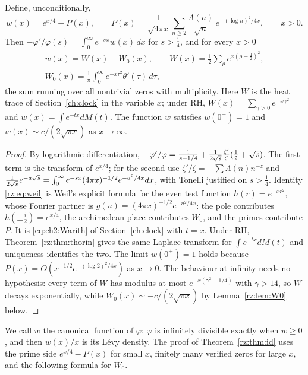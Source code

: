\begin{theorem}\label{rz:thm:w}
Define, unconditionally,
\[
w(x)=e^{x/4}-P(x),\qquad P(x)=\frac{1}{\sqrt{4\pi x}}\sum_{n\ge2}\frac{\Lambda(n)}{\sqrt n}\,e^{-(\log n)^2/4x},\qquad x>0.
\]
Then $-\varphi'/\varphi(s)=\int_0^\infty e^{-sx}w(x)\,dx$ for $s>\frac14$, and for every $x>0$
\begin{equation}\label{rz:eq:weil}
\begin{gathered}
w(x)=W(x)-W_0(x),\qquad W(x)=\tfrac12\sum_\rho e^{x(\rho-\frac12)^2},\\
W_0(x)=\frac1\pi\int_0^\infty e^{-x\tau^2}\theta'(\tau)\,d\tau,
\end{gathered}
\end{equation}
the sum running over all nontrivial zeros with multiplicity. Here $W$ is the heat trace of Section~\ref{ch:clock} in the variable $x$; under RH, $W(x)=\sum_{\gamma>0}e^{-x\gamma^2}$ and $w(x)=\int e^{-tx}dM(t)$. The function $w$ satisfies $w(0^+)=1$ and $w(x)\sim c/(2\sqrt{\pi x})$ as $x\to\infty$.
\end{theorem}

\begin{proof}
By logarithmic differentiation, $-\varphi'/\varphi=\frac{1}{s-1/4}+\frac{1}{2\sqrt{s}}\frac{\zeta'}{\zeta}(\frac12+\sqrt{s})$. The first term is the transform of $e^{x/4}$; for the second use $\zeta'/\zeta=-\sum\Lambda(n)n^{-z}$ and $\frac{1}{2\sqrt{s}}e^{-a\sqrt{s}}=\int_0^\infty e^{-sx}(4\pi x)^{-1/2}e^{-a^2/4x}dx$, with Tonelli justified on $s>\frac14$. Identity \eqref{rz:eq:weil} is Weil's explicit formula for the even test function $h(r)=e^{-xr^2}$, whose Fourier partner is $g(u)=(4\pi x)^{-1/2}e^{-u^2/4x}$: the pole contributes $h(\pm\frac i2)=e^{x/4}$, the archimedean place contributes $W_0$, and the primes contribute $P$. It is \eqref{eq:ch2:Warith} of Section~\ref{ch:clock} with $t=x$. Under RH, Theorem~\ref{rz:thm:thorin} gives the same Laplace transform for $\int e^{-tx}dM(t)$ and uniqueness identifies the two. The limit $w(0^+)=1$ holds because $P(x)=O(x^{-1/2}e^{-(\log2)^2/4x})$ as $x\to0$. The behaviour at infinity needs no hypothesis: every term of $W$ has modulus at most $e^{-x(\gamma^2-1/4)}$ with $\gamma>14$, so $W$ decays exponentially, while $W_0(x)\sim-c/(2\sqrt{\pi x})$ by Lemma~\ref{rz:lem:W0} below.
\end{proof}

We call $w$ the canonical function of $\varphi$: $\varphi$ is infinitely divisible exactly when $w\ge0$, and then $w(x)/x$ is its L\'evy density. The proof of Theorem~\ref{rz:thm:id} uses the prime side $e^{x/4}-P(x)$ for small $x$, finitely many verified zeros for large $x$, and the following formula for $W_0$.

